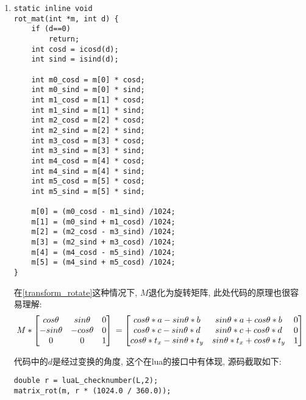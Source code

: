 {\begin {enumerate}
    \gaccobsplitinv

    \item { {}
        \begin{lstlisting}[language={[ANSI]C}]
static inline void
rot_mat(int *m, int d) {
    if (d==0)
        return;
    int cosd = icosd(d);
    int sind = isind(d);

    int m0_cosd = m[0] * cosd;
    int m0_sind = m[0] * sind;
    int m1_cosd = m[1] * cosd;
    int m1_sind = m[1] * sind;
    int m2_cosd = m[2] * cosd;
    int m2_sind = m[2] * sind;
    int m3_cosd = m[3] * cosd;
    int m3_sind = m[3] * sind;
    int m4_cosd = m[4] * cosd;
    int m4_sind = m[4] * sind;
    int m5_cosd = m[5] * cosd;
    int m5_sind = m[5] * sind;

    m[0] = (m0_cosd - m1_sind) /1024;
    m[1] = (m0_sind + m1_cosd) /1024;
    m[2] = (m2_cosd - m3_sind) /1024;
    m[3] = (m2_sind + m3_cosd) /1024;
    m[4] = (m4_cosd - m5_sind) /1024;
    m[5] = (m4_sind + m5_cosd) /1024;
}
        \end{lstlisting}

        在\eqref{transform_rotate}这种情况下, $M$退化为旋转矩阵, 此处代码的原理也很容易理解:
        \begin{equation}
            M *
            \begin{bmatrix}
                cos\theta  &  sin\theta  &   0\\
                -sin\theta &  -cos\theta &   0\\
                0          &  0          &   1
            \end{bmatrix}\\
            =
            \begin{bmatrix}
                cos\theta*a - sin\theta*b     & sin\theta*a + cos\theta*b     & 0\\
                cos\theta*c - sin\theta*d     & sin\theta*c + cos\theta*d     & 0\\
                cos\theta*t_x - sin\theta*t_y & sin\theta*t_x + cos\theta*t_y & 1
            \end{bmatrix}
        \end{equation}

        代码中的$d$是经过变换的角度, 这个在lua的接口中有体现, 源码截取如下:
        \begin{lstlisting}[language={[ANSI]C}]
double r = luaL_checknumber(L,2);
matrix_rot(m, r * (1024.0 / 360.0));
        \end{lstlisting}

}
\end{enumerate}}
